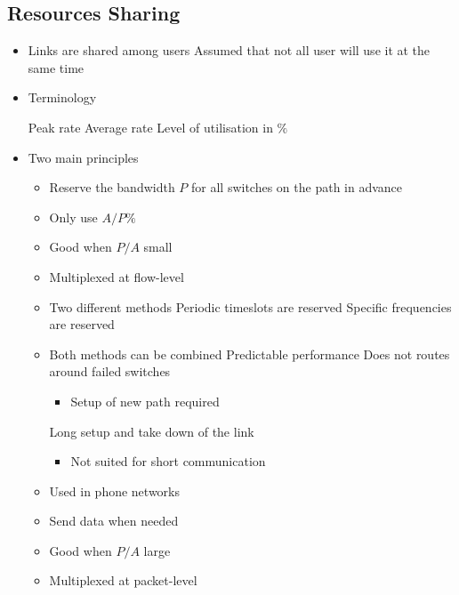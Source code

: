 \subsection{Resources Sharing}
\begin{itemize}
    \item Links are shared among users
     Assumed that not all user will use it at the same time
    \item Terminology
        \begin{itemize}
             Peak rate
             Average rate
             Level of utilisation in $\%$
        \end{itemize}
    \item Two main principles
        \begin{itemize}
            \item Reserve the bandwidth $P$ for all switches on the path in advance
            \item Only use $A/P\%$
            \item Good when $P/A$ small
            \item Multiplexed at flow-level
            \item Two different methods
             Periodic timeslots are reserved
             Specific frequencies are reserved
            \item Both methods can be combined
            \ipro Predictable performance
            \icon Does not routes around failed switches
                \begin{itemize}
                    \item Setup of new path required
                \end{itemize}
            \icon Long setup and take down of the link
                \begin{itemize}
                    \item Not suited for short communication
                \end{itemize}
            \item Used in phone networks
        \end{itemize}
        \begin{itemize}
            \item Send data when needed
            \item Good when $P/A$ large
            \item Multiplexed at packet-level

\end{itemize}
\end{itemize}
